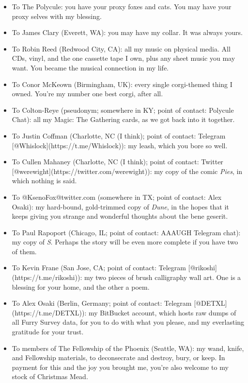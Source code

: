 \begin{enumerate}
  \begin{itemize}
  \tightlist
  \item
    To The Polycule: you have your proxy foxes and cats. You may have your proxy selves with my blessing.
  \item
    To James Clary (Everett, WA): you may have my collar. It was always yours.
  \item
    To Robin Reed (Redwood City, CA): all my music on physical media. All CDs, vinyl, and the one cassette tape I own, plus any sheet music you may want. You became the musical connection in my life.
  \item
    To Conor McKeown (Birmingham, UK): every single corgi-themed thing I owned. You're my number one best corgi, after all.
  \item
    To Colton-Reye (pseudonym; somewhere in KY; point of contact: Polycule Chat): all my Magic: The Gathering cards, as we got back into it together.
  \item
    To Justin Coffman (Charlotte, NC (I think); point of contact: Telegram {[}@Whislock{]}(https://t.me/Whislock)): my leash, which you bore so well.
  \item
    To Cullen Mahaney (Charlotte, NC (I think); point of contact: Twitter {[}@werewight{]}(https://twitter.com/werewight)): my copy of the comic \emph{Pies}, in which nothing is said.
  \item
    To @KsenoFox@twitter.com (somewhere in TX; point of contact: Alex Osaki): my hard-bound, gold-trimmed copy of \emph{Dune}, in the hopes that it keeps giving you strange and wonderful thoughts about the bene geserit.
  \item
    To Paul Rapoport (Chicago, IL; point of contact: AAAUGH Telegram chat): my copy of \emph{S}. Perhaps the story will be even more complete if you have two of them.
  \item
    To Kevin Frane (San Jose, CA; point of contact: Telegram {[}@rikoshi{]}(https://t.me/rikoshi)): my two pieces of brush calligraphy wall art. One is a blessing for your home, and the other a poem.
  \item
    To Alex Osaki (Berlin, Germany; point of contact: Telegram {[}@DETXL{]}(https://t.me/DETXL)): my BitBucket account, which hosts raw dumps of all Furry Survey data, for you to do with what you please, and my everlasting gratitude for your trust.
  \item
    To members of The Fellowship of the Phoenix (Seattle, WA): my wand, knife, and Fellowship materials, to deconsecrate and destroy, bury, or keep. In payment for this and the joy you brought me, you're also welcome to my stock of Christmas Mead.
  \end{itemize}
\end{enumerate}

